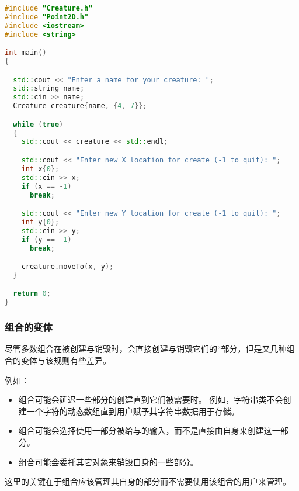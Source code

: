 \documentclass[../../LearnCpp.tex]{subfiles}
\begin{document}
\begin{lstlisting}[language=C++]
#include "Creature.h"
#include "Point2D.h"
#include <iostream>
#include <string>

int main()
{

  std::cout << "Enter a name for your creature: ";
  std::string name;
  std::cin >> name;
  Creature creature{name, {4, 7}};

  while (true)
  {
    std::cout << creature << std::endl;

    std::cout << "Enter new X location for create (-1 to quit): ";
    int x{0};
    std::cin >> x;
    if (x == -1)
      break;

    std::cout << "Enter new Y location for create (-1 to quit): ";
    int y{0};
    std::cin >> y;
    if (y == -1)
      break;

    creature.moveTo(x, y);
  }

  return 0;
}

\end{lstlisting}
\subsubsection*{组合的变体}

尽管多数组合在被创建与销毁时，会直接创建与销毁它们的“部分，但是又几种组合的变体与该规则有些差异。

例如：

\begin{itemize}
  \item 组合可能会延迟一些部分的创建直到它们被需要时。
        例如，字符串类不会创建一个字符的动态数组直到用户赋予其字符串数据用于存储。
  \item 组合可能会选择使用一部分被给与的输入，而不是直接由自身来创建这一部分。
  \item 组合可能会委托其它对象来销毁自身的一些部分。
\end{itemize}

这里的关键在于组合应该管理其自身的部分而不需要使用该组合的用户来管理。
\end{document}
